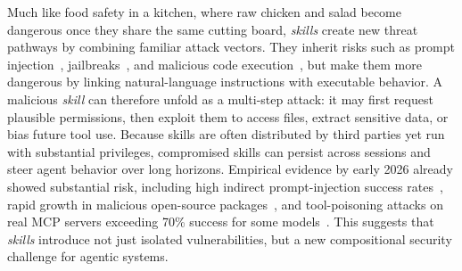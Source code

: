 \documentclass[sigconf,nonacm]{acmart}
\begin{document}

Much like food safety in a kitchen, where raw chicken and salad become dangerous once they share the same cutting board, \emph{skills} create new threat pathways by combining familiar attack vectors. They inherit risks such as prompt injection~\cite{debenedetti2024agentdojo}, jailbreaks~\cite{huang2024trustllm,huang2025trustworthiness}, and malicious code execution~\cite{jia2026skillject,liu2026malicious,liu2026agent,mo2025attractive,skillinject2026}, but make them more dangerous by linking natural-language instructions with executable behavior. A malicious \emph{skill} can therefore unfold as a multi-step attack: it may first request plausible permissions, then exploit them to access files, extract sensitive data, or bias future tool use. Because skills are often distributed by third parties yet run with substantial privileges, compromised skills can persist across sessions and steer agent behavior over long horizons. Empirical evidence by early 2026 already showed substantial risk, including high indirect prompt-injection success rates~\cite{zhan2024injecagent}, rapid growth in malicious open-source packages~\cite{sonatype2024ssc}, and tool-poisoning attacks on real MCP servers exceeding 70\% success for some models~\cite{invariant2025toolpoisoning,wang2025mcptox}. This suggests that \emph{skills} introduce not just isolated vulnerabilities, but a new compositional security challenge for agentic systems.
\end{document}
